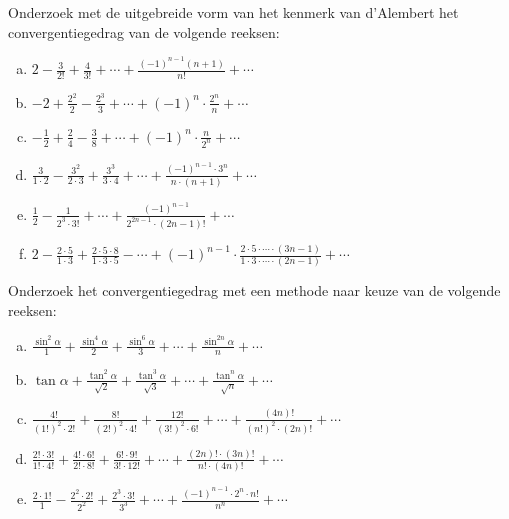 \documentclass[12pt,twoside]{article}
\begin{document}
\begin{oefening}
Onderzoek met de uitgebreide vorm van het kenmerk van d'Alembert het convergentiegedrag van de volgende reeksen:
\begin{enumerate}[(a)]
  \item $2 - \frac{3}{2!} + \frac{4}{3!} + \cdots + \frac{(-1)^{n-1}(n+1)}{n!} + \cdots$
  \item $-2 + \frac{2^2}{2} - \frac{2^3}{3} + \cdots + (-1)^n\cdot\frac{2^n}{n} + \cdots$
  \item $-\frac{1}{2} + \frac{2}{4} - \frac{3}{8} + \cdots + (-1)^n\cdot\frac{n}{2^n} + \cdots$
  \item $\frac{3}{1\cdot2} - \frac{3^2}{2\cdot3} + \frac{3^3}{3\cdot 4} + \cdots + \frac{(-1)^{n-1}\cdot 3^n}{n\cdot(n+1)} + \cdots$
  \item $\frac{1}{2} - \frac{1}{2^3\cdot 3!} + \cdots + \frac{(-1)^{n-1}}{2^{2n-1}\cdot(2n-1)!} + \cdots$
  \item $2 - \frac{2\cdot 5}{1\cdot 3} + \frac{2\cdot 5\cdot 8}{1\cdot 3\cdot 5} - \cdots + (-1)^{n-1}\cdot\frac{2\cdot 5\cdot \cdots \cdot (3n-1)}{1\cdot 3\cdot \cdots \cdot (2n-1)} + \cdots$
\end{enumerate}
\end{oefening}

\begin{oefening}
Onderzoek het convergentiegedrag met een methode naar keuze van de volgende reeksen:
\begin{enumerate}[(a)]
  \item $\frac{\sin^2\alpha}{1} + \frac{\sin^4\alpha}{2} + \frac{\sin^6\alpha}{3} + \cdots + \frac{\sin^{2n}\alpha}{n} + \cdots$
  \item $\tan\alpha + \frac{\tan^2\alpha}{\sqrt{2}} + \frac{\tan^3\alpha}{\sqrt{3}} + \cdots + \frac{\tan^n\alpha}{\sqrt{n}} + \cdots$
  \item $\frac{4!}{(1!)^2\cdot 2!} + \frac{8!}{(2!)^2\cdot 4!} + \frac{12!}{(3!)^2\cdot 6!} + \cdots + \frac{(4n)!}{(n!)^2\cdot (2n)!} + \cdots$
  \item $\frac{2!\cdot 3!}{1!\cdot 4!} + \frac{4!\cdot 6!}{2!\cdot 8!} + \frac{6!\cdot 9!}{3!\cdot 12!} + \cdots + \frac{(2n)!\cdot (3n)!}{n!\cdot (4n)!} + \cdots$
  \item $\frac{2\cdot 1!}{1} - \frac{2^2\cdot 2!}{2^2} + \frac{2^3\cdot 3!}{3^3} + \cdots + \frac{(-1)^{n-1}\cdot 2^n\cdot n!}{n^n} + \cdots$
\end{enumerate}
\end{oefening}
\end{document}
